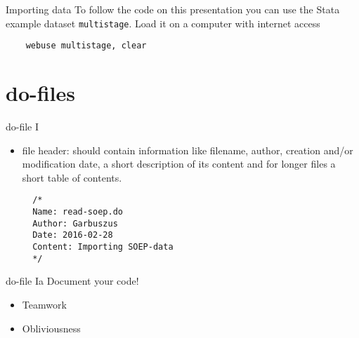 \begin{frame}[fragile]{Importing data}\label{multistage}
 To follow the code on this presentation you can use the Stata example dataset \texttt{multistage}. Load it on a computer with internet access
    \begin{lstlisting}
    webuse multistage, clear
    \end{lstlisting}
\end{frame}



\section{do-files}
\begin{frame}[fragile]{do-file I}
  \begin{itemize}
  \item file header: should contain information like filename, author, creation and/or modification date, a short description of its content and for longer files a short table of contents.
    
  \begin{lstlisting}
  /*
  Name: read-soep.do
  Author: Garbuszus
  Date: 2016-02-28
  Content: Importing SOEP-data
  */
  \end{lstlisting}
  \end{itemize}
\end{frame}

\begin{frame}{do-file Ia}
Document your code! 
\begin{itemize}
\item Teamwork
\item Obliviousness 
\end{itemize}

  

\end{frame}


